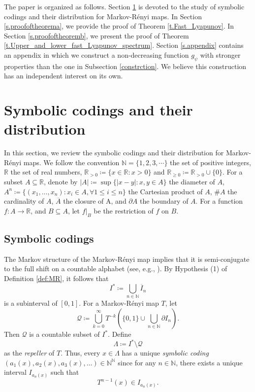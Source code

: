 \documentclass[12pt,reqno]{amsart}
\renewcommand{\=}{\coloneqq}
\theoremstyle{plain}
\begin{document}
The paper is organized as follows. Section \ref{s.distributiondigits} is devoted to the study of symbolic codings and their distribution for Markov-R\'{e}nyi maps. In Section \ref{s.proofoftheorema}, we provide the proof of Theorem \ref{t.Fast_Lyapunov}. In Section \ref{s.proofoftheoremb}, we present the proof of Theorem \ref{t.Upper_and_lower_fast_Lyapunov_spectrum}. Section \ref{s.appendix} contains an appendix in which we construct a non-decreasing function $g_{\psi}$ with stronger properties than the one in Subsection \ref{constrction}. We believe this construction has an independent interest on its own.


\section{Symbolic codings and their distribution}\label{s.distributiondigits}
In this section, we review the symbolic codings and their distribution for Markov-R\'{e}nyi maps.
We follow the convention $\mathbb{N}=\{1,2,3,\cdots\}$ the set of positive integers, $\mathbb{R}$ the set of real numbers, $\mathbb{R}_{>0}\coloneqq\{x\in \mathbb{R}:x>0\}$ and $\mathbb{R}_{\geq 0}\coloneqq\mathbb{R}_{>0}\cup\{0\}$.
For a subset $A\subseteq \mathbb{R}$, denote by $|A|\coloneqq \sup\{|x-y|:x,y\in A\}$ the diameter of $A$, $A^n \coloneqq \{(x_1,\dots,x_n): x_i \in A, \forall 1\leq i\leq n\}$ the Cartesian product of $A$, $\# A$ the cardinality of $A$, $\overline{A}$ the closure of A, and $\partial A$ the boundary of $A$. For a function $f:A \to \mathbb{R}$, and $B \subseteq A$, let $f|_B$ be the restriction of $f$ on $B$.


\subsection{Symbolic codings}
The Markov structure of the Markov-R\'{e}nyi map implies that it is semi-conjugate to the full shift on a countable alphabet (see, e.g., \cite{PW,Sar09}). By Hypothesis (1) of Definition \ref{def:MR}, it follows that
\[
I^* \coloneqq \bigcup_{n \in \mathbb N} \overline{I}_n
\]
is a subinterval of $[0,1]$. For a Markov-R\'{e}nyi map $T$, let $$\mathcal{Q}\coloneqq \bigcup^\infty_{k=0}T^{-k}\left(\{0,1\} \cup \bigcup_{n \in \mathbb N}\partial I_n\right).$$
Then $\mathcal{Q}$ is a countable subset of $I^*$.
Define $$\Lambda\coloneqq I^*\setminus \mathcal Q$$
as the \emph{repeller} of $T$.
Thus, every $x\in \Lambda$ has a unique \emph{symbolic coding} $(a_1(x),a_2(x),a_3(x),\dots) \in \mathbb N^{\mathbb N}$ since for any $n\in\mathbb N$, there exists a unique interval $I_{a_n(x)}$ such that
\begin{equation}\label{coding}
 T^{n-1}(x) \in I_{a_n(x)}.
\end{equation}
\end{document}
